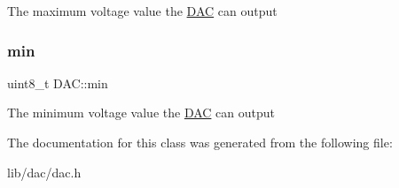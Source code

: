 The maximum voltage value the \hyperlink{class_d_a_c}{D\+AC} can output \hypertarget{class_d_a_c_aa4f21cf166374cfc6edcd412f4d2072b}{}\label{class_d_a_c_aa4f21cf166374cfc6edcd412f4d2072b} 
\subsubsection{\texorpdfstring{min}{min}}
{\footnotesize\ttfamily uint8\+\_\+t D\+A\+C\+::min\hspace{0.3cm}{\ttfamily [private]}}

The minimum voltage value the \hyperlink{class_d_a_c}{D\+AC} can output 

The documentation for this class was generated from the following file\+:\begin{DoxyCompactItemize}
\item 
lib/dac/dac.\+h\end{DoxyCompactItemize}
